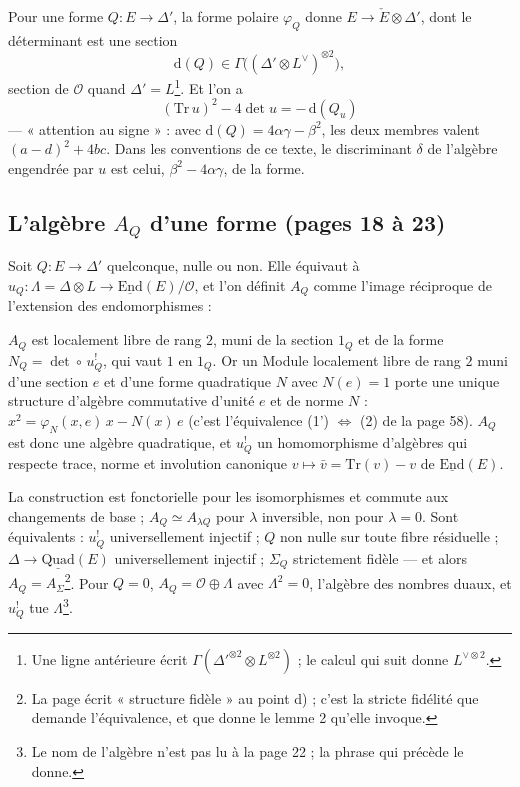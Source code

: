 \documentclass[11pt,a4paper]{article}
\begin{document}
Pour une forme $Q : E \to \Delta'$, la forme polaire $\varphi_Q$ donne
$E \to \check{E} \otimes \Delta'$, dont le déterminant est une section
\[
  \mathrm{d}(Q) \in \Gamma\bigl((\Delta' \otimes L^{\vee})^{\otimes 2}\bigr),
\]
section de $\mathcal{O}$ quand $\Delta' = L$\footnote{Une ligne antérieure écrit
$\Gamma(\Delta'^{\otimes 2} \otimes L^{\otimes 2})$ ; le calcul qui suit donne
$L^{\vee \otimes 2}$.}. Et l'on a
\[
  \boxed{\ (\mathrm{Tr}\,u)^{2} - 4\det u = -\,\mathrm{d}(Q_u)\ }
\]
--- « attention au signe » : avec $\mathrm{d}(Q) = 4\alpha\gamma - \beta^{2}$, les deux
membres valent $(a - d)^{2} + 4bc$. Dans les conventions de ce texte, le
discriminant $\delta$ de l'algèbre engendrée par $u$ est celui, $\beta^{2} -
4\alpha\gamma$, de la forme.

\subsection*{L'algèbre $A_Q$ d'une forme (pages 18 à 23)}

Soit $Q : E \to \Delta'$ quelconque, nulle ou non. Elle équivaut à
$u_Q : \Lambda = \Delta \otimes L \to \underline{\mathrm{End}}(E)/\mathcal{O}$, et l'on
définit $A_Q$ comme l'image réciproque de l'extension des endomorphismes :


$A_Q$ est localement libre de rang $2$, muni de la section $1_Q$ et de la forme
$N_Q = \det \circ\, u^{!}_Q$, qui vaut $1$ en $1_Q$. Or un Module localement libre
de rang $2$ muni d'une section $e$ et d'une forme quadratique $N$ avec $N(e) = 1$
porte une unique structure d'algèbre commutative d'unité $e$ et de norme $N$ :
$x^{2} = \varphi_N(x, e)\,x - N(x)\,e$ (c'est l'équivalence (1') $\Leftrightarrow$ (2) de
la page 58). $A_Q$ est donc une algèbre quadratique, et $u^{!}_Q$ un homomorphisme
d'algèbres qui respecte trace, norme et involution canonique
$v \mapsto \bar{v} = \mathrm{Tr}(v) - v$ de $\underline{\mathrm{End}}(E)$.

La construction est fonctorielle pour les isomorphismes et commute aux
changements de base ; $A_Q \simeq A_{\lambda Q}$ pour $\lambda$ inversible, non pour
$\lambda = 0$. Sont équivalents : $u^{!}_Q$ universellement injectif ; $Q$ non nulle
sur toute fibre résiduelle ; $\Delta \to \underline{\mathrm{Quad}}(E)$ universellement
injectif ; $\Sigma_Q$ strictement fidèle --- et alors $A_Q = A_\Sigma$\footnote{La
page écrit « structure fidèle » au point d) ; c'est la stricte fidélité que
demande l'équivalence, et que donne le lemme 2 qu'elle invoque.}. Pour $Q = 0$,
$A_Q = \mathcal{O} \oplus \Lambda$ avec $\Lambda^{2} = 0$, l'algèbre des nombres duaux,
et $u^{!}_Q$ tue $\Lambda$\footnote{Le nom de l'algèbre n'est pas lu à la page 22 ;
la phrase qui précède le donne.}.
\end{document}
